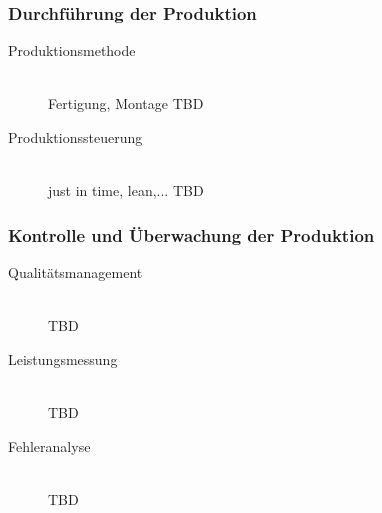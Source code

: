 \documentclass[a4paper,12pt, german]{report}
\begin{document}
\subsubsection{Durchführung der Produktion}

\begin{description}
  \item[Produktionsmethode]\hfill \\
  Fertigung, Montage TBD

  \item[Produktionssteuerung]\hfill \\ 
  just in time, lean,... TBD
  \end{description}

\subsubsection{Kontrolle und Überwachung der Produktion}

\begin{description}
  \item[Qualitätsmanagement]\hfill \\
  TBD
  \item[Leistungsmessung]\hfill \\ 
  TBD
  \item[Fehleranalyse]\hfill \\ 
  TBD
  \end{description}





\end{document}
